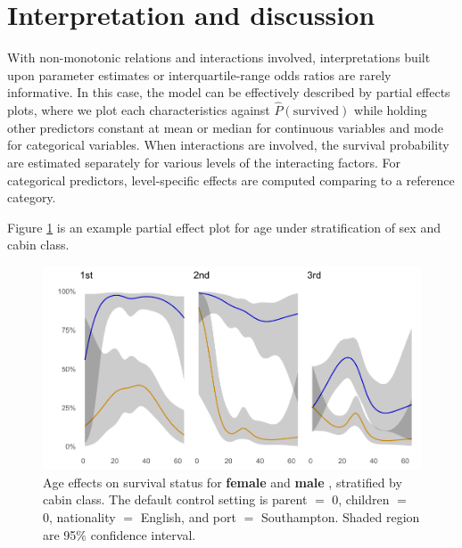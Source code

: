 \documentclass[]{interact}
\theoremstyle{plain}%
\theoremstyle{definition}
\theoremstyle{remark}
\begin{document}
\hypertarget{interpretation}{%
\section{Interpretation and discussion}\label{interpretation}}

With non-monotonic relations and interactions involved, interpretations built upon parameter estimates or interquartile-range odds ratios are rarely informative. In this case, the model can be effectively described by partial effects plots, where we plot each characteristics against \(\hat{P}(\text{survived})\) while holding other predictors constant at mean or median for continuous variables and mode for categorical variables. When interactions are involved, the survival probability are estimated separately for various levels of the interacting factors. For categorical predictors, level-specific effects are computed comparing to a reference category.

Figure \ref{fig:partial-age-sex-cabin} is an example partial effect plot for age under stratification of sex and cabin class.

\begin{figure}[H]

{\centering \includegraphics{titanic-survival_files/figure-latex/partial-age-sex-cabin-1} 

}

\caption{Age effects on survival status for \color{blue} \textbf{female} \color{black} and \color{orange} \textbf{male} \color{black}, stratified by cabin class. The default control setting is parent \(=\) 0, children \(=\) 0, nationality \(=\) English, and port \(=\) Southampton. Shaded region are 95\% confidence interval.}\label{fig:partial-age-sex-cabin}
\end{figure}
\end{document}
